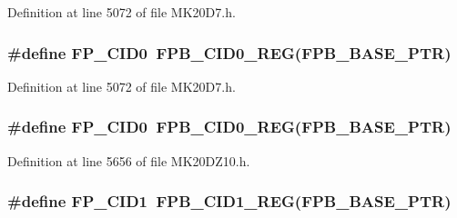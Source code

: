 Definition at line 5072 of file M\+K20\+D7.\+h.

\subsubsection[{\texorpdfstring{F\+P\+\_\+\+C\+I\+D0}{FP_CID0}}]{\setlength{\rightskip}{0pt plus 5cm}\#define F\+P\+\_\+\+C\+I\+D0~{\bf F\+P\+B\+\_\+\+C\+I\+D0\+\_\+\+R\+EG}({\bf F\+P\+B\+\_\+\+B\+A\+S\+E\+\_\+\+P\+TR})}\hypertarget{group___f_p_b___register___accessor___macros_ga52c7dddc23c33f6c4cec456ab5006cfe}{}\label{group___f_p_b___register___accessor___macros_ga52c7dddc23c33f6c4cec456ab5006cfe}


Definition at line 5072 of file M\+K20\+D7.\+h.

\subsubsection[{\texorpdfstring{F\+P\+\_\+\+C\+I\+D0}{FP_CID0}}]{\setlength{\rightskip}{0pt plus 5cm}\#define F\+P\+\_\+\+C\+I\+D0~{\bf F\+P\+B\+\_\+\+C\+I\+D0\+\_\+\+R\+EG}({\bf F\+P\+B\+\_\+\+B\+A\+S\+E\+\_\+\+P\+TR})}\hypertarget{group___f_p_b___register___accessor___macros_ga52c7dddc23c33f6c4cec456ab5006cfe}{}\label{group___f_p_b___register___accessor___macros_ga52c7dddc23c33f6c4cec456ab5006cfe}


Definition at line 5656 of file M\+K20\+D\+Z10.\+h.

\subsubsection[{\texorpdfstring{F\+P\+\_\+\+C\+I\+D1}{FP_CID1}}]{\setlength{\rightskip}{0pt plus 5cm}\#define F\+P\+\_\+\+C\+I\+D1~{\bf F\+P\+B\+\_\+\+C\+I\+D1\+\_\+\+R\+EG}({\bf F\+P\+B\+\_\+\+B\+A\+S\+E\+\_\+\+P\+TR})}\hypertarget{group___f_p_b___register___accessor___macros_gae72090dc299cc0ce88752ac1aef4a17f}{}\label{group___f_p_b___register___accessor___macros_gae72090dc299cc0ce88752ac1aef4a17f}


